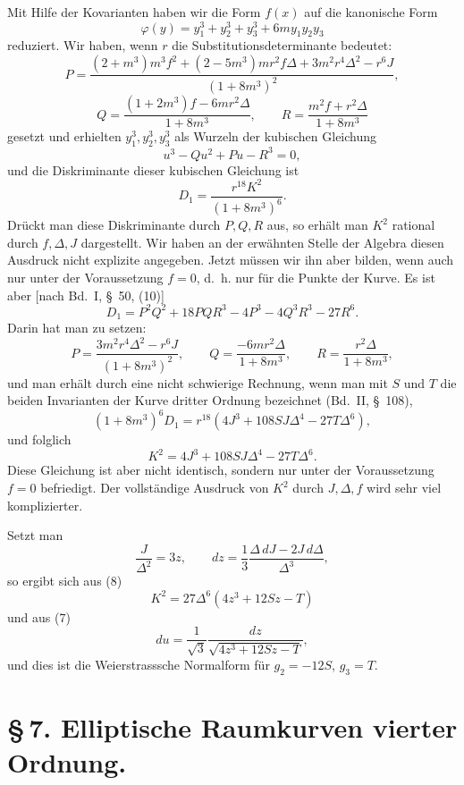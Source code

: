 \documentclass[11pt]{article}
\begin{document}
Mit Hilfe der Kovarianten haben wir die Form $f(x)$ auf die kanonische Form
\[
\varphi(y)=y_1^3+y_2^3+y_3^3+6my_1y_2y_3
\]
reduziert. Wir haben, wenn $r$ die Substitutionsdeterminante bedeutet:
\[
P=\frac{(2+m^3)m^3f^2+(2-5m^3)mr^2f\Delta+3m^2r^4\Delta^2-r^6J}{(1+8m^3)^2},
\]
\[
Q=\frac{(1+2m^3)f-6mr^2\Delta}{1+8m^3},\qquad
R=\frac{m^2f+r^2\Delta}{1+8m^3}
\]
gesetzt und erhielten $y_1^3,y_2^3,y_3^3$ als Wurzeln der kubischen Gleichung
\[
u^3-Qu^2+Pu-R^3=0,
\]
und die Diskriminante dieser kubischen Gleichung ist
\[
D_1=\frac{r^{18}K^2}{(1+8m^3)^6}.
\]
Drückt man diese Diskriminante durch $P,Q,R$ aus, so erhält man $K^2$ rational durch $f,\Delta,J$ dargestellt. Wir haben an der erwähnten Stelle der Algebra diesen Ausdruck nicht explizite angegeben. Jetzt müssen wir ihn aber bilden, wenn auch nur unter der Voraussetzung $f=0$, d.~h. nur für die Punkte der Kurve. Es ist aber [nach Bd.~I, \S~50, (10)]
\[
D_1=P^2Q^2+18PQR^3-4P^3-4Q^3R^3-27R^6.
\]
Darin hat man zu setzen:
\[
P=\frac{3m^2r^4\Delta^2-r^6J}{(1+8m^3)^2},\qquad
Q=\frac{-6mr^2\Delta}{1+8m^3},\qquad
R=\frac{r^2\Delta}{1+8m^3},
\]
und man erhält durch eine nicht schwierige Rechnung, wenn man mit $S$ und $T$ die beiden Invarianten der Kurve dritter Ordnung bezeichnet (Bd.~II, \S~108),
\[
(1+8m^3)^6D_1=r^{18}(4J^3+108SJ\Delta^4-27T\Delta^6),
\]
und folglich
\begin{equation}
K^2=4J^3+108SJ\Delta^4-27T\Delta^6.
\tag{8}
\end{equation}
Diese Gleichung ist aber nicht identisch, sondern nur unter der Voraussetzung $f=0$ befriedigt. Der vollständige Ausdruck von $K^2$ durch $J,\Delta,f$ wird sehr viel komplizierter.

Setzt man
\begin{equation}
\frac{J}{\Delta^2}=3z,\qquad dz=\frac13\frac{\Delta\,dJ-2J\,d\Delta}{\Delta^3},
\tag{9}
\end{equation}
so ergibt sich aus (8)
\[
K^2=27\Delta^6(4z^3+12Sz-T)
\]
und aus (7)
\begin{equation}
du=\frac1{\sqrt3}\frac{dz}{\sqrt{4z^3+12Sz-T}},
\tag{10}
\end{equation}
und dies ist die Weierstrasssche Normalform für $g_2=-12S$, $g_3=T$.


\section*{\S\,7. Elliptische Raumkurven vierter Ordnung.}
\end{document}
